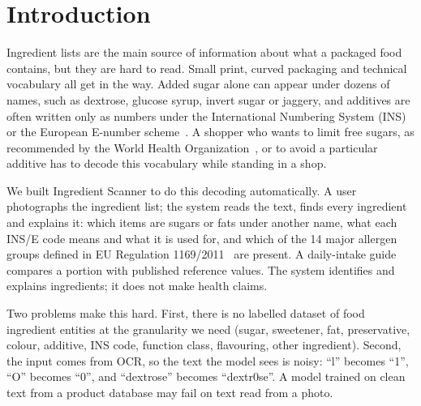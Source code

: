 \documentclass[conference]{IEEEtran}
\begin{document}
\section{Introduction}

Ingredient lists are the main source of information about what a packaged food contains, but they are hard to read. Small print, curved packaging and technical vocabulary all get in the way. Added sugar alone can appear under dozens of names, such as dextrose, glucose syrup, invert sugar or jaggery, and additives are often written only as numbers under the International Numbering System (INS) or the European E-number scheme~\cite{codex_ins}. A shopper who wants to limit free sugars, as recommended by the World Health Organization~\cite{who_sugars}, or to avoid a particular additive has to decode this vocabulary while standing in a shop.

We built Ingredient Scanner to do this decoding automatically. A user photographs the ingredient list; the system reads the text, finds every ingredient and explains it: which items are sugars or fats under another name, what each INS/E code means and what it is used for, and which of the 14 major allergen groups defined in EU Regulation 1169/2011~\cite{eu_1169} are present. A daily-intake guide compares a portion with published reference values. The system identifies and explains ingredients; it does not make health claims.

Two problems make this hard. First, there is no labelled dataset of food ingredient entities at the granularity we need (sugar, sweetener, fat, preservative, colour, additive, INS code, function class, flavouring, other ingredient). Second, the input comes from OCR, so the text the model sees is noisy: ``l'' becomes ``1'', ``O'' becomes ``0'', and ``dextrose'' becomes ``dextr0se''. A model trained on clean text from a product database may fail on text read from a photo.
\end{document}

